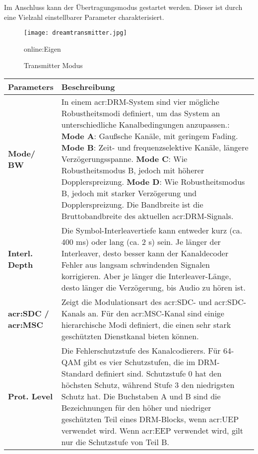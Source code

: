 Im Anschluss kann der Übertragungsmodus gestartet werden. Dieser ist durch eine Vielzahl einstellbarer Parameter charakterisiert. 
\begin{figure}[H]
	\centering
	\texttt{[image: dreamtransmitter.jpg]}
	\caption[Transmitter Modus]{Transmitter Modus} \gls{online:Eigen}
	\label{fig:dreamtransmitter}
\end{figure}
\begin{table}[H]
	\begin{center}
		\begin{tabular}{p{0.17\linewidth}  p{0.83\linewidth}}	
			\toprule
			\textbf{Parameters} &\textbf{Beschreibung}\\
			\midrule
			\textbf{Mode/ BW} & In einem \gls{acr:DRM}-System sind vier mögliche Robustheitsmodi definiert, um das System an unterschiedliche Kanalbedingungen anzupassen.:\newline
			\textbf{Mode A}: Gaußsche Kanäle, mit geringem Fading.\newline
			\textbf{Mode B}: Zeit- und frequenzselektive Kanäle, längere Verzögerungsspanne.\newline
			\textbf{Mode C}: Wie Robustheitsmodus B, jedoch mit höherer Dopplerspreizung.\newline
			\textbf{Mode D}: Wie Robustheitsmodus B, jedoch mit starker Verzögerung und Dopplerspreizung.\newline
			Die Bandbreite ist die Bruttobandbreite des aktuellen \gls{acr:DRM}-Signals. \\

			\textbf{Interl. Depth} & Die Symbol-Interleavertiefe kann entweder kurz (ca. 400 ms) oder lang (ca. 2 s) sein. Je länger der Interleaver, desto besser kann der Kanaldecoder Fehler aus langsam schwindenden Signalen korrigieren. Aber je länger die Interleaver-Länge, desto länger die Verzögerung, bis Audio zu hören ist.\\
				
			\textbf{\gls{acr:SDC} / \gls{acr:MSC}} & Zeigt die Modulationsart des \gls{acr:SDC}- und \gls{acr:SDC}-Kanals an. Für den \gls{acr:MSC}-Kanal sind einige hierarchische Modi definiert, die einen sehr stark geschützten Dienstkanal bieten können.\\
		
			\textbf{Prot. Level} & Die Fehlerschutzstufe des Kanalcodierers. Für 64-QAM gibt es vier Schutzstufen, die im DRM-Standard definiert sind. Schutzstufe 0 hat den höchsten Schutz, während Stufe 3 den niedrigsten Schutz hat. Die Buchstaben A und B sind die Bezeichnungen für den höher und niedriger geschützten Teil eines DRM-Blocks, wenn \gls{acr:UEP} verwendet wird. Wenn \gls{acr:EEP} verwendet wird, gilt nur die Schutzstufe von Teil B.\\
		

\end{tabular}
\end{center}
\end{table}
